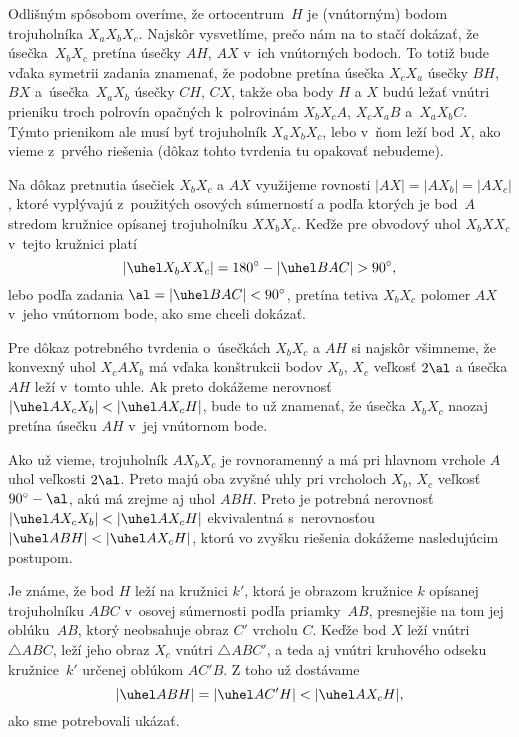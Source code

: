 {\Jres
Odlišným spôsobom overíme, že ortocentrum~$H$
je (vnútorným) bodom trojuholníka $X_aX_bX_c$. Najskôr vysvetlíme, prečo nám
na to stačí dokázať, že úsečka~$X_bX_c$ pretína úsečky $AH$, $AX$
v~ich vnútorných bodoch. To totiž bude vďaka symetrii zadania znamenať,
že podobne pretína úsečka $X_cX_a$ úsečky $BH$, $BX$ a~úsečka~$X_aX_b$
úsečky $CH$, $CX$, takže oba body $H$ a $X$ budú ležať vnútri
prieniku troch polrovín opačných k~polrovinám $X_bX_cA$, $X_cX_aB$
a~$X_aX_bC$. Týmto prienikom ale musí byť trojuholník $X_aX_bX_c$,
lebo v~ňom leží bod $X$, ako vieme z~prvého riešenia (dôkaz tohto
tvrdenia tu opakovať nebudeme).

Na dôkaz pretnutia úsečiek $X_bX_c$ a $AX$ využijeme rovnosti
$|AX|=|AX_b|=|AX_c|$, ktoré vyplývajú z~použitých osových súmerností
a podľa ktorých je bod~$A$ stredom kružnice opísanej trojuholníku
$XX_bX_c$. Keďže pre obvodový uhol $X_bXX_c$ v~tejto kružnici
platí
$$
|\uhel X_bXX_c|=180^{\circ}-|\uhel BAC|>90^{\circ},
$$
lebo podľa zadania $\al=|\uhel BAC|<90^{\circ}$,
pretína tetiva $X_bX_c$ polomer $AX$ v~jeho vnútornom bode, ako
sme chceli dokázať.

Pre dôkaz potrebného tvrdenia o~úsečkách $X_bX_c$ a $AH$
si najskôr všimneme, že konvexný uhol $X_cAX_b$ má vďaka konštrukcii bodov
$X_b$, $X_c$ veľkosť $2\al$ a úsečka $AH$ leží v~tomto uhle.
Ak preto dokážeme nerovnosť $|\uhel AX_cX_b|<|\uhel AX_cH|$, bude to
už znamenať, že úsečka $X_bX_c$ naozaj pretína úsečku $AH$
v~jej vnútornom bode.
%

Ako už vieme, trojuholník $AX_bX_c$ je rovnoramenný a má pri hlavnom
vrchole $A$ uhol veľkosti $2\al$. Preto majú oba zvyšné
uhly pri vrcholoch $X_b$, $X_c$ veľkosť $90^{\circ}-\al$, akú má
zrejme aj uhol $ABH$. Preto je potrebná nerovnosť
$|\uhel AX_cX_b|<|\uhel AX_cH|$ ekvivalentná s~nerovnosťou
$|\uhel ABH|<|\uhel AX_cH|$, ktorú vo zvyšku riešenia dokážeme
nasledujúcim postupom.

Je známe, že bod $H$ leží na kružnici $k'$, ktorá je obrazom
kružnice $k$ opísanej trojuholníku $ABC$ v~osovej súmernosti podľa
priamky~$AB$, presnejšie na tom jej oblúku~$AB$, ktorý neobsahuje
obraz $C'$ vrcholu $C$. Keďže bod $X$ leží vnútri
$\triangle ABC$, leží jeho obraz $X_c$ vnútri $\triangle ABC'$, a
teda aj vnútri kruhového odseku kružnice~$k'$ určenej oblúkom $AC'B$.
Z toho už dostávame
$$
|\uhel ABH|=|\uhel AC'H|<|\uhel AX_cH|,
$$
ako sme potrebovali ukázať.

}
